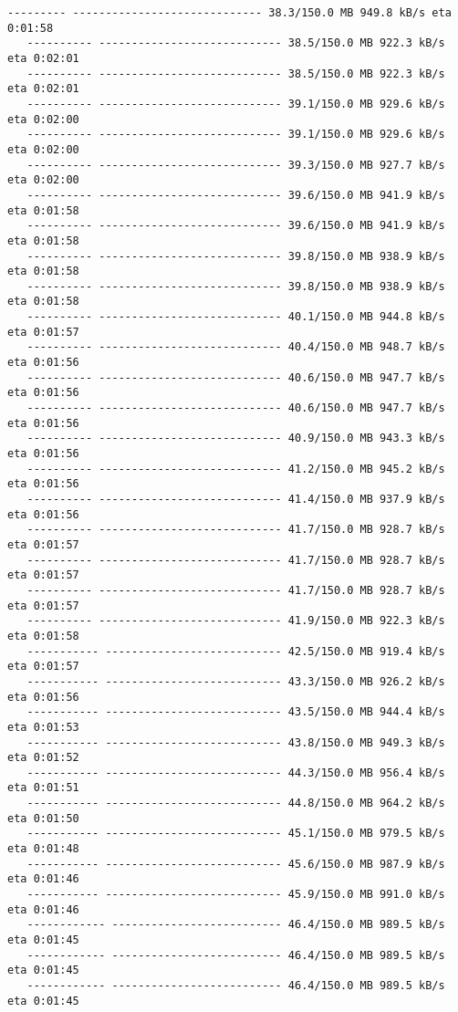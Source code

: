 \documentclass[11pt]{article}
\begin{document}
\begin{Verbatim}[commandchars=\\\{\}]
   --------- ----------------------------- 38.3/150.0 MB 949.8 kB/s eta 0:01:58
   ---------- ---------------------------- 38.5/150.0 MB 922.3 kB/s eta 0:02:01
   ---------- ---------------------------- 38.5/150.0 MB 922.3 kB/s eta 0:02:01
   ---------- ---------------------------- 39.1/150.0 MB 929.6 kB/s eta 0:02:00
   ---------- ---------------------------- 39.1/150.0 MB 929.6 kB/s eta 0:02:00
   ---------- ---------------------------- 39.3/150.0 MB 927.7 kB/s eta 0:02:00
   ---------- ---------------------------- 39.6/150.0 MB 941.9 kB/s eta 0:01:58
   ---------- ---------------------------- 39.6/150.0 MB 941.9 kB/s eta 0:01:58
   ---------- ---------------------------- 39.8/150.0 MB 938.9 kB/s eta 0:01:58
   ---------- ---------------------------- 39.8/150.0 MB 938.9 kB/s eta 0:01:58
   ---------- ---------------------------- 40.1/150.0 MB 944.8 kB/s eta 0:01:57
   ---------- ---------------------------- 40.4/150.0 MB 948.7 kB/s eta 0:01:56
   ---------- ---------------------------- 40.6/150.0 MB 947.7 kB/s eta 0:01:56
   ---------- ---------------------------- 40.6/150.0 MB 947.7 kB/s eta 0:01:56
   ---------- ---------------------------- 40.9/150.0 MB 943.3 kB/s eta 0:01:56
   ---------- ---------------------------- 41.2/150.0 MB 945.2 kB/s eta 0:01:56
   ---------- ---------------------------- 41.4/150.0 MB 937.9 kB/s eta 0:01:56
   ---------- ---------------------------- 41.7/150.0 MB 928.7 kB/s eta 0:01:57
   ---------- ---------------------------- 41.7/150.0 MB 928.7 kB/s eta 0:01:57
   ---------- ---------------------------- 41.7/150.0 MB 928.7 kB/s eta 0:01:57
   ---------- ---------------------------- 41.9/150.0 MB 922.3 kB/s eta 0:01:58
   ----------- --------------------------- 42.5/150.0 MB 919.4 kB/s eta 0:01:57
   ----------- --------------------------- 43.3/150.0 MB 926.2 kB/s eta 0:01:56
   ----------- --------------------------- 43.5/150.0 MB 944.4 kB/s eta 0:01:53
   ----------- --------------------------- 43.8/150.0 MB 949.3 kB/s eta 0:01:52
   ----------- --------------------------- 44.3/150.0 MB 956.4 kB/s eta 0:01:51
   ----------- --------------------------- 44.8/150.0 MB 964.2 kB/s eta 0:01:50
   ----------- --------------------------- 45.1/150.0 MB 979.5 kB/s eta 0:01:48
   ----------- --------------------------- 45.6/150.0 MB 987.9 kB/s eta 0:01:46
   ----------- --------------------------- 45.9/150.0 MB 991.0 kB/s eta 0:01:46
   ------------ -------------------------- 46.4/150.0 MB 989.5 kB/s eta 0:01:45
   ------------ -------------------------- 46.4/150.0 MB 989.5 kB/s eta 0:01:45
   ------------ -------------------------- 46.4/150.0 MB 989.5 kB/s eta 0:01:45

\end{Verbatim}
\end{document}

